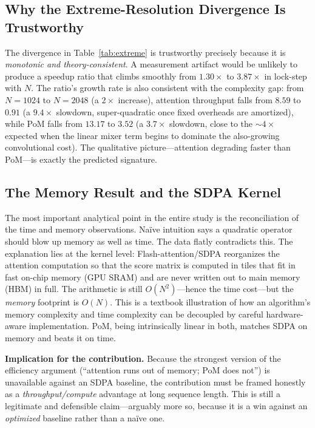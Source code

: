 \documentclass[11pt,a4paper]{article}
\begin{document}
\subsection{Why the Extreme-Resolution Divergence Is Trustworthy}

The divergence in Table~\ref{tab:extreme} is trustworthy precisely because it is \emph{monotonic and theory-consistent}. A measurement artifact would be unlikely to produce a speedup ratio that climbs smoothly from $1.30\times$ to $3.87\times$ in lock-step with $N$. The ratio's growth rate is also consistent with the complexity gap: from $N=1024$ to $N=2048$ (a $2\times$ increase), attention throughput falls from $8.59$ to $0.91$ (a $9.4\times$ slowdown, super-quadratic once fixed overheads are amortized), while PoM falls from $13.17$ to $3.52$ (a $3.7\times$ slowdown, close to the $\sim$$4\times$ expected when the linear mixer term begins to dominate the also-growing convolutional cost). The qualitative picture---attention degrading faster than PoM---is exactly the predicted signature.

\subsection{The Memory Result and the SDPA Kernel}

The most important analytical point in the entire study is the reconciliation of the time and memory observations. Na\"ive intuition says a quadratic operator should blow up memory as well as time. The data flatly contradicts this. The explanation lies at the kernel level: Flash-attention/SDPA reorganizes the attention computation so that the score matrix is computed in tiles that fit in fast on-chip memory (GPU SRAM) and are never written out to main memory (HBM) in full. The arithmetic is still $O(N^2)$---hence the time cost---but the \emph{memory} footprint is $O(N)$. This is a textbook illustration of how an algorithm's memory complexity and time complexity can be decoupled by careful hardware-aware implementation. PoM, being intrinsically linear in both, matches SDPA on memory and beats it on time.

\textbf{Implication for the contribution.} Because the strongest version of the efficiency argument (``attention runs out of memory; PoM does not'') is unavailable against an SDPA baseline, the contribution must be framed honestly as a \emph{throughput/compute} advantage at long sequence length. This is still a legitimate and defensible claim---arguably more so, because it is a win against an \emph{optimized} baseline rather than a na\"ive one.
\end{document}
